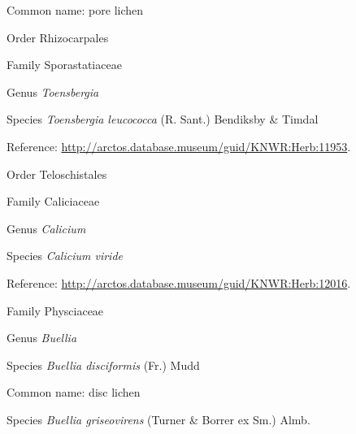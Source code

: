 \documentclass[9pt, article]{memoir}
\begin{document}
\begin{multicols}{2}
Common name: pore lichen

\vspace{6pt}\noindent\hspace{18pt}Order Rhizocarpales


\vspace{6pt}\noindent\hspace{24pt}Family Sporastatiaceae


\vspace{6pt}\noindent\hspace{30pt}Genus \textit{Toensbergia}


\vspace{6pt}\noindent\hspace{36pt}Species \textit{Toensbergia leucococca} (R. Sant.) Bendiksby \& Timdal


Reference: 
\url{http://arctos.database.museum/guid/KNWR:Herb:11953}.

\vspace{6pt}\noindent\hspace{18pt}Order Teloschistales


\vspace{6pt}\noindent\hspace{24pt}Family Caliciaceae


\vspace{6pt}\noindent\hspace{30pt}Genus \textit{Calicium}


\vspace{6pt}\noindent\hspace{36pt}Species \textit{Calicium viride}


Reference: 
\url{http://arctos.database.museum/guid/KNWR:Herb:12016}.

\vspace{6pt}\noindent\hspace{24pt}Family Physciaceae


\vspace{6pt}\noindent\hspace{30pt}Genus \textit{Buellia}


\vspace{6pt}\noindent\hspace{36pt}Species \textit{Buellia disciformis} (Fr.) Mudd


Common name: disc lichen

\vspace{6pt}\noindent\hspace{36pt}Species \textit{Buellia griseovirens} (Turner \& Borrer ex Sm.) Almb.



\end{multicols}
\end{document}
